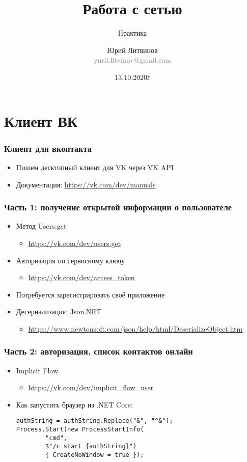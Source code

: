 \documentclass[xetex,mathserif,serif]{beamer}
\title{Работа с сетью}
\subtitle{Практика}
\author[Юрий Литвинов]{Юрий Литвинов\\\small{\textcolor{gray}{yurii.litvinov@gmail.com}}}
\date{13.10.2020г}
\begin{document}
    \frame{\titlepage}

    \section{Клиент ВК}

    \begin{frame}
        \frametitle{Клиент для вконтакта}
        \begin{itemize}
            \item Пишем десктопный клиент для VK через VK API
            \item Документация: \url{https://vk.com/dev/manuals}
        \end{itemize}
    \end{frame}

    \begin{frame}
        \frametitle{Часть 1: получение открытой информации о пользователе}
        \begin{itemize}
            \item Метод Users.get
            \begin{itemize}
                \item \url{https://vk.com/dev/users.get}
            \end{itemize}
            \item Авторизация по сервисному ключу
            \begin{itemize}
                \item \url{https://vk.com/dev/access_token}
            \end{itemize}
            \item Потребуется зарегистрировать своё приложение
            \item Десериализация: Json.NET
            \begin{itemize}
                \item \url{https://www.newtonsoft.com/json/help/html/DeserializeObject.htm}
            \end{itemize}
        \end{itemize}
    \end{frame}

    \begin{frame}[fragile]
        \frametitle{Часть 2: авторизация, список контактов онлайн}
        \begin{itemize}
            \item Implicit Flow
            \begin{itemize}
                \item \url{https://vk.com/dev/implicit_flow_user}
            \end{itemize}
            \item Как запустить браузер из .NET Core:
            \begin{verbatim}
authString = authString.Replace("&", "^&");
Process.Start(new ProcessStartInfo(
        "cmd", 
        $"/c start {authString}") 
        { CreateNoWindow = true });
            \end{verbatim}
        \end{itemize}
    \end{frame}
\end{document}

